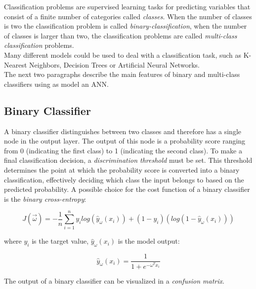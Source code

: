 Classification problems are supervised learning tasks for predicting variables that consist of a finite number of categories called
\textit{classes}. 
When the number of classes is two the classification problem is called \textit{binary-classification}, when the number of classes is larger than
two, the classification problems are called \textit{multi-class classification} problems. \\
Many different models could be used to deal with a classification task, such as K-Nearest Neighbors, Decision
Trees or Artificial Neural Networks.\\
The next two paragraphs describe the main features of binary and multi-class classifiers using as model an ANN.



\subsection{Binary Classifier}

A binary classifier distinguishes between two classes and therefore has a single node in the output layer. The output of this 
node is a probability score ranging from 0 (indicating the first class) to 1 (indicating the second class). To make a final 
classification decision, a \textit{discrimination threshold} must be set. This threshold determines the point at which the probability score is 
converted into a binary classification, effectively deciding which class the input belongs to based on the predicted probability.
A possible choice for the cost function of a binary classifier is the \textit{binary cross-entropy}:

\begin{equation}
J(\vec{\omega}) = - \frac{1}{n} \sum_{i=1}^n y_i log(\hat{y}_\omega(x_i)) + (1-y_i)(log(1-\hat{y}_\omega(x_i)))
\end{equation}

where $y_i$ is the target value, $\hat{y}_\omega(x_i)$ is the model output:

\begin{equation}
\hat{y}_{\omega}(x_i) = \frac{1}{1+e^{-\omega^Tx_i}}
\end{equation}

The output of a binary classifier can be visualized in a \textit{confusion matrix}.

